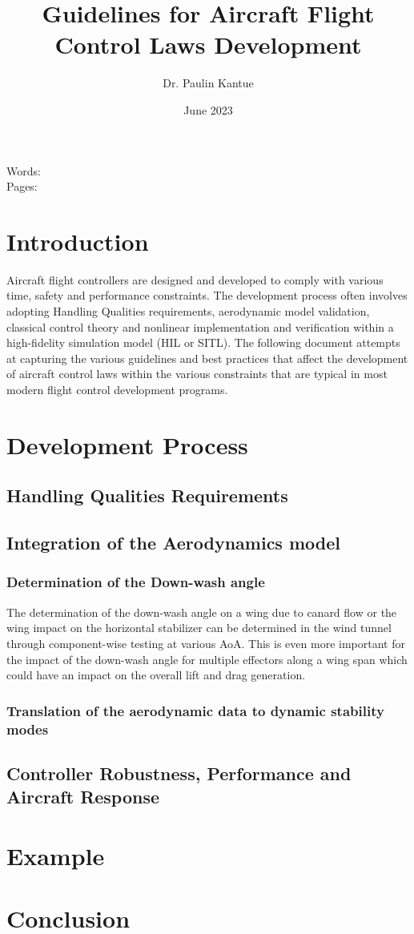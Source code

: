 \documentclass[nobib]{MSword}
\title{Guidelines for Aircraft Flight Control Laws Development}
\author{Dr. Paulin Kantue}
\date{June 2023}
\begin{document}
\makenomenclature 
\maketitle
\begin{center}
    Words: \\ %
    Pages: \pageref{LastPage} %
\end{center}

\printnomenclature

\section{Introduction}
Aircraft flight controllers are designed and developed to comply with various time, safety and performance constraints. The development process often involves adopting Handling Qualities requirements, aerodynamic model validation, classical control theory and nonlinear implementation and verification within a high-fidelity simulation model (HIL or SITL). The following document attempts at capturing the various guidelines and best practices that affect the development of aircraft control laws within the various constraints that are typical in most modern flight control development programs.

\section{Development Process}
\subsection{Handling Qualities Requirements}
\subsection{Integration of the Aerodynamics model}
\subsubsection{Determination of the Down-wash angle}
The determination of the down-wash angle on a wing due to canard flow or the wing impact on the horizontal stabilizer can be determined in the wind tunnel through component-wise testing at various \nomenclature[]{}{}AoA. This is even more important for the impact of the down-wash angle for multiple effectors along a wing span which could have an impact on the overall lift and drag generation. 


\subsubsection{Translation of the aerodynamic data to dynamic stability modes}
\subsection{Controller Robustness, Performance and Aircraft Response}
\section{Example}

\section{Conclusion}
\end{document}

